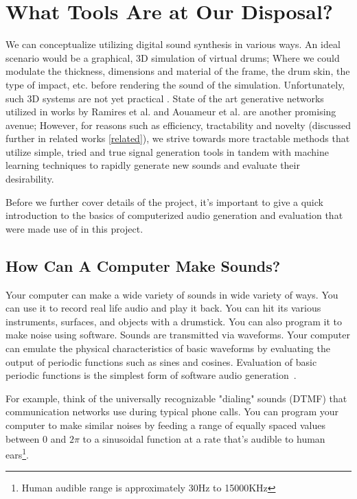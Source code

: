 \documentclass[\main/thesis.tex]{subfiles}
\begin{document}
\section{What Tools Are at Our Disposal?}
\label{sec_tools_disposal}
We can conceptualize utilizing digital sound synthesis in various ways. An ideal scenario would be a graphical, 3D simulation of virtual drums; Where we could modulate the thickness, dimensions and material of the frame, the drum skin, the type of impact, etc. before rendering the sound of the simulation. Unfortunately, such 3D systems are not yet practical \cite{langlois2016toward}. State of the art generative networks utilized in works by Ramires et al. \cite{ramires2020neural} and Aouameur et al.\cite{aouameur2019neural} 
are another promising avenue; However, for reasons such as efficiency, tractability and novelty (discussed further in related works \ref{related}), we strive towards more tractable methods that utilize simple, tried and true signal generation tools in tandem with machine learning techniques to rapidly generate new sounds and evaluate their desirability.

Before we further cover details of the project, it's important to give a quick introduction to the basics of computerized audio generation and evaluation that were made use of in this project.
\subsection{How Can A Computer Make Sounds?}
\label{sec:computer_make_sound}
Your computer can make a wide variety of sounds in wide variety of ways. You can use it to record real life audio and play it back. You can hit its various instruments, surfaces, and objects with a drumstick. You can also program it to make noise using software.
Sounds are transmitted via waveforms. Your computer can emulate the physical characteristics of basic waveforms by evaluating the output of periodic functions such as sines and cosines. Evaluation of basic periodic functions is the simplest form of software audio generation~\cite{mitchell2009basicsynthChap5}.

For example, think of the universally recognizable "dialing" sounds (DTMF) that communication networks use during typical phone calls. You can program your computer to make similar noises by feeding a range of equally spaced values between 0 and $2\pi$ to a sinusoidal function at a rate that's audible to human ears\footnote{Human audible range is approximately 30Hz to 15000KHz}. 
\end{document}

